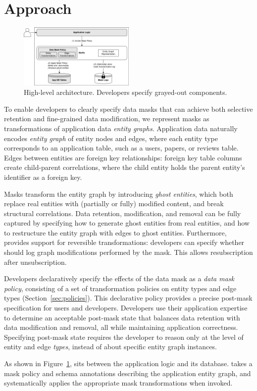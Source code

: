\section{Approach}

\begin{figure}[t!]
    \centering
    \includegraphics[width=0.5\textwidth]{img/muffle}

    \caption{High-level \sys architecture. Developers specify grayed-out components.}
    \label{fig:arch}
\end{figure}

To enable developers to clearly specify data masks that can achieve both selective retention and
fine-grained data modification, we represent masks as transformations of
application data \emph{entity graphs}. Application data naturally encodes \emph{entity graph} of
entity nodes and edges, where each entity type corresponds to an application table, such as a users,
papers, or reviews table. Edges between entities are foreign key relationships: foreign key table
columns create child-parent correlations, where the child entity holds the parent entity's
identifier as a foreign key. 

Masks transform the entity graph by introducing \emph{ghost entities}, which both replace real
entities with (partially or fully) modified content, and break structural correlations. Data
retention, modification, and removal can be fully captured by specifying how to generate ghost
entities from real entities, and how to restructure the entity graph with edges to ghost entities.
Furthermore, \sys provides support for reversible transformations: developers can specify whether
\sys should log graph modifications performed by the mask. This allows \eg resubscription after unsubscription.

Developers declaratively specify the effects of the data mask as a \emph{data mask policy},
consisting of a set of transformation policies on entity types and edge types
(Section~\ref{sec:policies}). This declarative policy provides a precise post-mask specification for
users and developers. Developers use their application expertise to determine an acceptable
post-mask state that balances data retention with data modification and removal, all while
maintaining application correctness. Specifying post-mask state requires the developer to reason
only at the level of entity and edge \emph{types}, instead of about specific entity graph instances.

As shown in Figure~\ref{fig:arch}, \sys sits between the application logic and its database. 
\sys takes a mask policy and schema annotations describing the application entity graph,
and systematically applies the appropriate mask transformations when invoked. 
